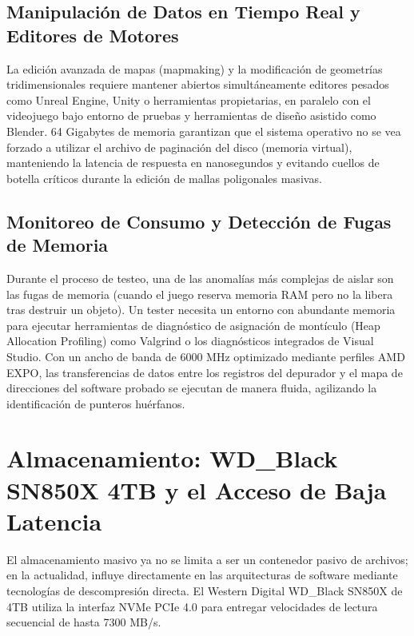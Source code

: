 \documentclass[12pt,a4paper]{article}
\begin{document}
\subsection{Manipulación de Datos en Tiempo Real y Editores de Motores}
La edición avanzada de mapas (mapmaking) y la modificación de geometrías tridimensionales requiere mantener abiertos simultáneamente editores pesados como Unreal Engine, Unity o herramientas propietarias, en paralelo con el videojuego bajo entorno de pruebas y herramientas de diseño asistido como Blender. 64 Gigabytes de memoria garantizan que el sistema operativo no se vea forzado a utilizar el archivo de paginación del disco (memoria virtual), manteniendo la latencia de respuesta en nanosegundos y evitando cuellos de botella críticos durante la edición de mallas poligonales masivas.

\subsection{Monitoreo de Consumo y Detección de Fugas de Memoria}
Durante el proceso de testeo, una de las anomalías más complejas de aislar son las fugas de memoria (cuando el juego reserva memoria RAM pero no la libera tras destruir un objeto). Un tester necesita un entorno con abundante memoria para ejecutar herramientas de diagnóstico de asignación de montículo (Heap Allocation Profiling) como Valgrind o los diagnósticos integrados de Visual Studio. Con un ancho de banda de 6000 MHz optimizado mediante perfiles AMD EXPO, las transferencias de datos entre los registros del depurador y el mapa de direcciones del software probado se ejecutan de manera fluida, agilizando la identificación de punteros huérfanos.

\newpage

\section{Almacenamiento: WD\_Black SN850X 4TB y el Acceso de Baja Latencia}

El almacenamiento masivo ya no se limita a ser un contenedor pasivo de archivos; en la actualidad, influye directamente en las arquitecturas de software mediante tecnologías de descompresión directa. El Western Digital WD\_Black SN850X de 4TB utiliza la interfaz NVMe PCIe 4.0 para entregar velocidades de lectura secuencial de hasta 7300 MB/s.
\end{document}
